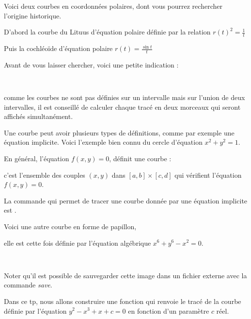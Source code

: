 Voici deux courbes en coordonnées polaires, dont vous pourrez rechercher l'origine historique. 

\change
D'abord la courbe du Lituus d'équation polaire définie par la relation
  $r(t)^2 = \frac{1}{t}$
  
\change  
Puis la cochléoïde d'équation polaire 
  $r(t) = \frac{\sin t}{t}$


\change


Avant de vous laisser chercher, voici une petite indication : 

~

comme les courbes ne sont pas définies sur un intervalle mais sur l'union de deux intervalles, il est conseillé de calculer chaque tracé en deux morceaux qui seront affichés simultanément.


\diapo

Une courbe peut avoir plusieurs types de définitions, comme par exemple une équation implicite. %
Voici l'exemple bien connu du cercle d'équation $x^2+y^2=1$.

\change
En général, l'équation $f(x,y)=0$, définit une courbe :

\change
c'est l'ensemble des couples $(x,y)$ 
dans $[a,b]\times[c,d]$ qui vérifient l'équation $f(x,y)=0$.

\change
La commande qui permet de tracer une courbe donnée par une équation implicite est .

\change
Voici une autre courbe en forme de papillon, 

\change
elle est cette fois définie par l'équation algébrique $x^6+y^6-x^2=0$. 

~

Noter qu'il est possible de sauvegarder cette image dans un fichier externe avec la commande {\sl save}.



\diapo


Dans ce tp, nous allons construire une fonction qui renvoie le tracé de la courbe définie par
 l'équation $y^2-x^3+x+c = 0$
  en fonction d'un paramètre $c$ réel.%

